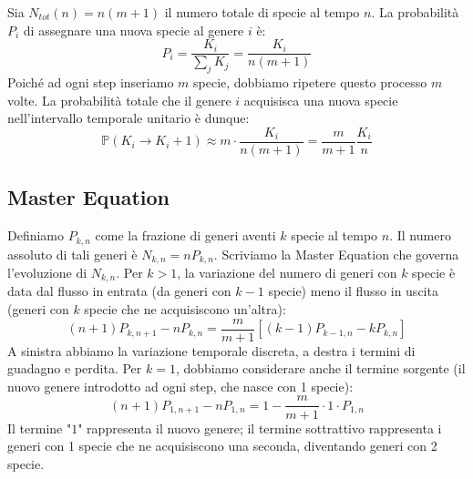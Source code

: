 \noindent Sia $N_{tot}(n) = n(m+1)$ il numero totale di specie al tempo $n$. La probabilità $P_i$ di assegnare una nuova specie al genere $i$ è:
\begin{equation}
    P_i = \frac{K_i}{\sum_j K_j} = \frac{K_i}{n(m+1)}
\end{equation}
Poiché ad ogni step inseriamo $m$ specie, dobbiamo ripetere questo processo $m$ volte. La probabilità totale che il genere $i$ acquisisca una nuova specie nell'intervallo temporale unitario è dunque:
\begin{equation}
    \mathbb{P}(K_i \to K_i + 1) \approx m \cdot \frac{K_i}{n(m+1)} = \frac{m}{m+1} \frac{K_i}{n}
\end{equation}

\subsection{Master Equation}
Definiamo $P_{k,n}$ come la frazione di generi aventi $k$ specie al tempo $n$. Il numero assoluto di tali generi è $N_{k,n} = n P_{k,n}$.
Scriviamo la Master Equation che governa l'evoluzione di $N_{k,n}$.
Per $k > 1$, la variazione del numero di generi con $k$ specie è data dal flusso in entrata (da generi con $k-1$ specie) meno il flusso in uscita (generi con $k$ specie che ne acquisiscono un'altra):
\begin{equation}
    (n+1)P_{k,n+1} - n P_{k,n} = \frac{m}{m+1} \left[ (k-1)P_{k-1,n} - k P_{k,n} \right]
\end{equation}
A sinistra abbiamo la variazione temporale discreta, a destra i termini di guadagno e perdita.
Per $k=1$, dobbiamo considerare anche il termine sorgente (il nuovo genere introdotto ad ogni step, che nasce con 1 specie):
\begin{equation}
    (n+1)P_{1,n+1} - n P_{1,n} = 1 - \frac{m}{m+1} \cdot 1 \cdot P_{1,n}
\end{equation}
Il termine "$1$" rappresenta il nuovo genere; il termine sottrattivo rappresenta i generi con 1 specie che ne acquisiscono una seconda, diventando generi con 2 specie.

